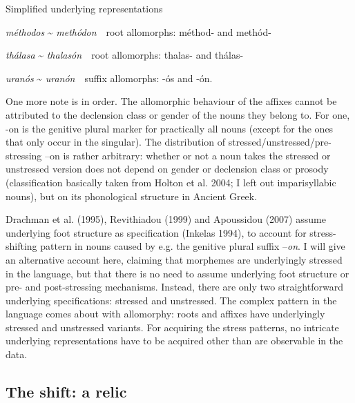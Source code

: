 \documentclass[a4paper]{article}
\begin{document}
\ea Simplified underlying representations

{
\textit{méthodos} \~{} \textit{methódon}\ \ root allomorphs: {\textbar}méthod-{\textbar} and {\textbar}methód-{\textbar}}

{
\textit{thálasa} \~{} \textit{thalasón}\ \ root allomorphs: {\textbar}thalas-{\textbar} and {\textbar}thálas-{\textbar}}

{
\textit{uranós} \~{} \textit{uranón}\ \ suffix allomorphs: {\textbar}-ós{\textbar} and {\textbar}-ón{\textbar}.}
\z

One more note is in order. The allomorphic behaviour of the affixes cannot be attributed to the declension class or gender of the nouns they belong to. For one, -on is the genitive plural marker for practically all nouns (except for the ones that only occur in the singular). The distribution of stressed/unstressed/pre-stressing –on is rather arbitrary: whether or not a noun takes the stressed or unstressed version does not depend on gender or declension class or prosody (classification basically taken from Holton et al. 2004; I left out imparisyllabic nouns), but on its phonological structure in Ancient Greek.

Drachman et al. (1995), Revithiadou (1999) and Apoussidou (2007) assume underlying foot structure as specification (Inkelas 1994), to account for stress-shifting pattern in nouns caused by e.g. the genitive plural suffix –\textit{on}. I will give an alternative account here, claiming that morphemes are underlyingly stressed in the language, but that there is no need to assume underlying foot structure or pre- and post-stressing mechanisms. Instead, there are only two straightforward underlying specifications: stressed and unstressed. The complex pattern in the language comes about with allomorphy: roots and affixes have underlyingly stressed and unstressed variants. For acquiring the stress patterns, no intricate underlying representations have to be acquired other than are observable in the data.


\subsection{
The shift: a relic}
\end{document}
